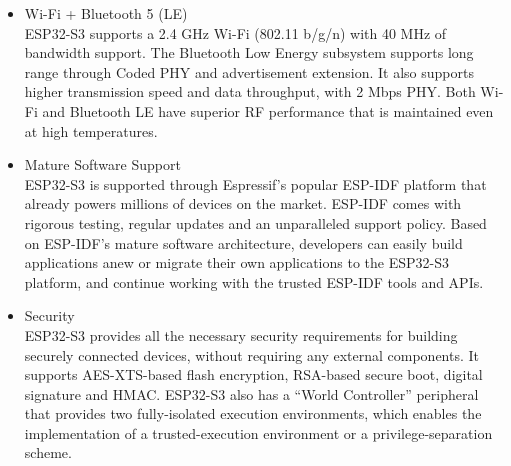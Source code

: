 \documentclass[conference]{IEEEtran}
\begin{document}
\begin{itemize}
\item Wi-Fi + Bluetooth 5 (LE)\\
ESP32-S3 supports a 2.4 GHz Wi-Fi (802.11 b/g/n) with 40 MHz of bandwidth support. The Bluetooth Low Energy subsystem supports long range through Coded PHY and advertisement extension. It also supports higher transmission speed and data throughput, with 2 Mbps PHY. Both Wi-Fi and Bluetooth LE have superior RF performance that is maintained even at high temperatures.\\
\item Mature Software Support\\
ESP32-S3 is supported through Espressif’s popular ESP-IDF platform that already powers millions of devices on the market. ESP-IDF comes with rigorous testing, regular updates and an unparalleled support policy. Based on ESP-IDF’s mature software architecture, developers can easily build applications anew or migrate their own applications to the ESP32-S3 platform, and continue working with the trusted ESP-IDF tools and APIs.\\
\item Security\\
ESP32-S3 provides all the necessary security requirements for building securely connected devices, without requiring any external components. It supports AES-XTS-based flash encryption, RSA-based secure boot, digital signature and HMAC. ESP32-S3 also has a “World Controller” peripheral that provides two fully-isolated execution environments, which enables the implementation of a trusted-execution environment or a privilege-separation scheme.\\
\end{itemize}
\end{document}
